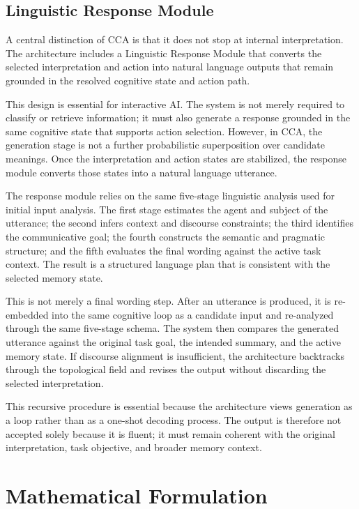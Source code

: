 \documentclass[10pt,journal,compsoc]{IEEEtran}
\begin{document}
\subsection{Linguistic Response Module}

A central distinction of CCA is that it does not stop at internal interpretation. The architecture includes a Linguistic Response Module that converts the selected interpretation and action into natural language outputs that remain grounded in the resolved cognitive state and action path.

This design is essential for interactive AI. The system is not merely required to classify or retrieve information; it must also generate a response grounded in the same cognitive state that supports action selection. However, in CCA, the generation stage is not a further probabilistic superposition over candidate meanings. Once the interpretation and action states are stabilized, the response module converts those states into a natural language utterance.

The response module relies on the same five-stage linguistic analysis used for initial input analysis. The first stage estimates the agent and subject of the utterance; the second infers context and discourse constraints; the third identifies the communicative goal; the fourth constructs the semantic and pragmatic structure; and the fifth evaluates the final wording against the active task context. The result is a structured language plan that is consistent with the selected memory state.

This is not merely a final wording step. After an utterance is produced, it is re-embedded into the same cognitive loop as a candidate input and re-analyzed through the same five-stage schema. The system then compares the generated utterance against the original task goal, the intended summary, and the active memory state. If discourse alignment is insufficient, the architecture backtracks through the topological field and revises the output without discarding the selected interpretation.

This recursive procedure is essential because the architecture views generation as a loop rather than as a one-shot decoding process. The output is therefore not accepted solely because it is fluent; it must remain coherent with the original interpretation, task objective, and broader memory context.

\section{Mathematical Formulation}
\end{document}
